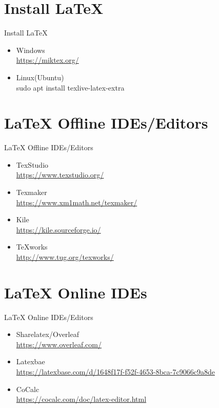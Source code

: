 \documentclass[dvipsnames, aspectratio=169]{beamer}
\begin{document}
	\section{Install \LaTeX} 
	\begin{frame}[t]{Install \LaTeX} \vspace{10pt}
		\begin{itemize}
			\item Windows\\
			\url{https://miktex.org/}
			\item Linux(Ubuntu) \\ 
			sudo apt install texlive-latex-extra
		\end{itemize}
	\end{frame}


	\section{{\LaTeX} Offline IDEs/Editors}
	\begin{frame}[t]{{\LaTeX} Offline IDEs/Editors}\vspace{10pt}
		\begin{itemize}
			\item TexStudio \\
			\url{https://www.texstudio.org/}
			\item Texmaker \\
			\url{https://www.xm1math.net/texmaker/}
			\item Kile \\
			\url{https://kile.sourceforge.io/}
			\item TeXworks \\
			\url{http://www.tug.org/texworks/}
		\end{itemize}
	\end{frame}

	\section{{\LaTeX} Online IDEs}
	\begin{frame}[t]{{\LaTeX} Online IDEs/Editors}\vspace{10pt}
	\begin{itemize}
		\item Sharelatex/Overleaf \\
		 \url{https://www.overleaf.com/}
		\item Latexbae \\ 
		\url{https://latexbase.com/d/1648f17f-f52f-4653-8bca-7c9066c9a8de}
		\item CoCalc \\
		\url{https://cocalc.com/doc/latex-editor.html}
	\end{itemize}
	\end{frame}
\end{document}

